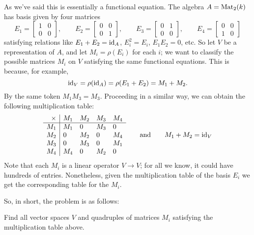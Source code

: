 As we've said this is essentially a functional equation.
The algebra $A = \mathrm{Mat}_2(k)$ has basis given by four matrices
\[
	E_1 = \begin{bmatrix} 1 & 0 \\ 0 & 0 \end{bmatrix},
	\qquad
	E_2 = \begin{bmatrix} 0 & 0 \\ 0 & 1 \end{bmatrix},
	\qquad
	E_3 = \begin{bmatrix} 0 & 1 \\ 0 & 0 \end{bmatrix},
	\qquad
	E_4 = \begin{bmatrix} 0 & 0 \\ 1 & 0 \end{bmatrix}
\]
satisfying relations like $E_1 + E_2 = \mathrm{id}_A$, $E_i^2 = E_i$, $E_1E_2 = 0$, etc.
So let $V$ be a representation of $A$, and let $M_i = \rho(E_i)$ for each $i$;
we want to classify the possible matrices $M_i$ on $V$
satisfying the same functional equations.
This is because, for example,
\[ \mathrm{id}_V = \rho(\mathrm{id}_A) = \rho(E_1+E_2) = M_1 + M_2. \]
By the same token $M_1M_3 = M_3$.
Proceeding in a similar way, we can obtain the following multiplication table:
\[
	\begin{array}{r|llll}
		\times & M_1 & M_2 & M_3 & M_4 \\ \hline
		M_1 & M_1 & 0 & M_3 & 0 \\
		M_2 & 0 & M_2 & 0 & M_4 \\
		M_3 & 0 & M_3 & 0 & M_1 \\
		M_4 & M_4 & 0 & M_2 & 0
	\end{array}
	\qquad \text{and} \qquad
	M_1 + M_2 = \mathrm{id}_V
\]
Note that each $M_i$ is a linear operator $V \to V$;
for all we know, it could have hundreds of entries.
Nonetheless, given the multiplication table of the basis $E_i$
we get the corresponding table for the $M_i$.

So, in short, the problem is as follows:
\begin{moral}
	Find all vector spaces $V$ and quadruples of matrices $M_i$
	satisfying the multiplication table above.
\end{moral}

